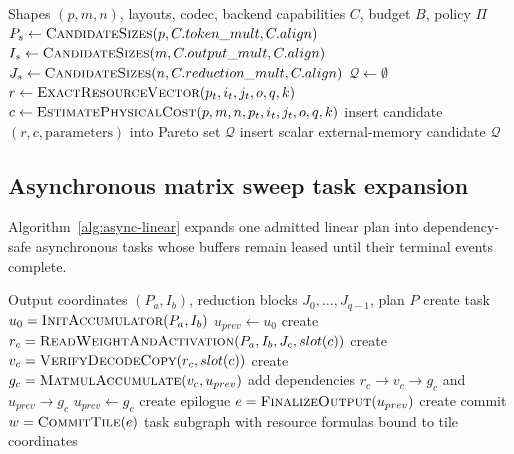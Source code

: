 \begin{algorithm}[H]
\caption{Generate legal linear tile candidates}
\label{alg:linear-candidates}
\begin{algorithmic}[1]
\Require Shapes $(p,m,n)$, layouts, codec, backend capabilities $C$, budget $B$, policy $\Pi$
\State $P_s\gets\Call{CandidateSizes}{p,C.token\_mult,C.align}$
\State $I_s\gets\Call{CandidateSizes}{m,C.output\_mult,C.align}$
\State $J_s\gets\Call{CandidateSizes}{n,C.reduction\_mult,C.align}$
\State $\mathcal Q\gets\emptyset$
        \State $r\gets\Call{ExactResourceVector}{p_t,i_t,j_t,o,q,k}$
          \State $c\gets\Call{EstimatePhysicalCost}{p,m,n,p_t,i_t,j_t,o,q,k}$
          \State insert candidate $(r,c,\text{parameters})$ into Pareto set $\mathcal Q$
        \EndIf
      \EndFor
    \EndFor
  \EndFor
\EndFor
{}
  \State insert scalar external-memory candidate
\EndIf
\State \Return $\mathcal Q$
\end{algorithmic}
\end{algorithm}

\subsection{Asynchronous matrix sweep task expansion}

Algorithm~\ref{alg:async-linear} expands one admitted linear plan into dependency-safe asynchronous tasks whose buffers remain leased until their terminal events complete.

\begin{algorithm}[H]
\caption{Expand one output tile into asynchronous tasks}
\label{alg:async-linear}
\begin{algorithmic}[1]
\Require Output coordinates $(P_a,I_b)$, reduction blocks $J_0,\ldots,J_{q-1}$, plan $P$
\State create task $u_0=\Call{InitAccumulator}{P_a,I_b}$
\State $u_{prev}\gets u_0$
  \State create $r_c=\Call{ReadWeightAndActivation}{P_a,I_b,J_c,slot(c)}$
  \State create $v_c=\Call{VerifyDecodeCopy}{r_c,slot(c)}$
  \State create $g_c=\Call{MatmulAccumulate}{v_c,u_{prev}}$
  \State add dependencies $r_c\to v_c\to g_c$ and $u_{prev}\to g_c$
  \State $u_{prev}\gets g_c$
\EndFor
\State create epilogue $e=\Call{FinalizeOutput}{u_{prev}}$
\State create commit $w=\Call{CommitTile}{e}$
\State \Return task subgraph with resource formulas bound to tile coordinates
\end{algorithmic}
\end{algorithm}

